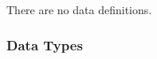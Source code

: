 \documentclass[12pt]{article}
\newcommand{\colAwidth}{0.13\textwidth}
\newcommand{\colBwidth}{0.82\textwidth}
\newcounter{defnum} %
\newcommand{\dref}[1]{GD\ref{#1}}
\newcounter{datadefnum} %
\newcommand{\aref}[1]{A\ref{#1}}
\newcommand{\iref}[1]{IM\ref{#1}}
\begin{document}
%

There are no data definitions.


\subsubsection{Data Types}\label{sec_datatypes}
\end{document}
